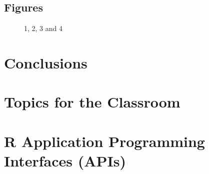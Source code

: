 \subsection{Figures}

\begin{figure}[H]
	\centering
	\begin{minipage}[b]{0.5\linewidth}
	\end{minipage}\hfill
	\begin{minipage}[b]{0.5\linewidth}
	\end{minipage}\hfill	
	\begin{minipage}[b]{0.5\linewidth}
	\end{minipage}\hfill
	\begin{minipage}[b]{0.5\linewidth}
	\end{minipage}\hfill
	\caption{1, 2, 3 and 4}
	\label{fig:Figure1}
\end{figure} 

\section{Conclusions}


\section{Topics for the Classroom}

\begin{enumerate}
\end{enumerate}

\section{R Application Programming Interfaces (APIs)}




